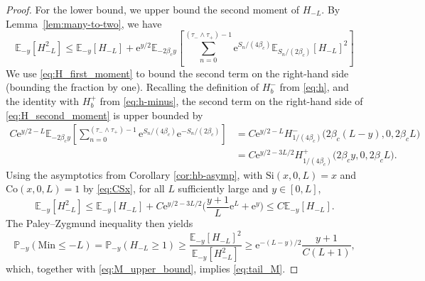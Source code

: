 \documentclass[a4paper, a4wide, 10pt, reqno]{amsart}
\theoremstyle{plain}
\theoremstyle{definition}
\numberwithin{equation}{section}
\newcommand{\E}{\mathbb E}
\newcommand{\Prob}{\mathbb{P}}
\newcommand{\re}{{\mathrm e}}
\newcommand{\Co}{{\mathrm{Co}}}
\newcommand{\Si}{{\mathrm{Si}}}
\begin{document}
\begin{proof}
     For the lower bound, we upper bound the second moment of $H_{-L}$. By Lemma~\ref{lem:many-to-two}, we have
     \begin{equation}
     \label{eq:H_second_moment}
         \E_{-y}[H_{-L}^2] \le \E_{-y}[H_{-L}] + \re^{y/2}\E_{-2\beta_c y}\left[\sum_{n=0}^{(\tau_-\wedge \tau_+)-1} \re^{S_n/(4\beta_c)}\E_{S_n/(2\beta_c)}[H_{-L}]^2\right]
     \end{equation}
     We use \eqref{eq:H_first_moment} to bound the second term on the right-hand side (bounding the fraction  by one). Recalling the definition of $H^-_b$ from \eqref{eq:h}, and the identity with $H^+_b$ from \eqref{eq:h-minus}, the second term on the right-hand side of \eqref{eq:H_second_moment} is upper bounded by
	\begin{align*}
		C \re^{y/2-L}\E_{-2\beta_c y}\left[\sum_{n=0}^{(\tau_-\wedge \tau_+)-1} \re^{S_n/(4\beta_c)}\re^{-S_n/(2\beta_c)}\right] &=C\re^{y/2-L}H^-_{1/(4\beta_c)}\big(2\beta_c (L-y), 0, 2\beta_c L\big)\\&=C\re^{y/2-3L/2}H^+_{1/(4\beta_c)}\big(2\beta_c y, 0, 2\beta_c L\big).
	\end{align*}
    Using the asymptotics from Corollary \ref{cor:hb-asymp}, with $\Si(x, 0, L)=x$ and $\Co(x, 0, L)=1$ by \eqref{eq:CSx},  for all $L$ sufficiently large and $y\in [0, L]$,
    \begin{equation}\label{eq:H_second_moment_final}
    \E_{-y}[H_{-L}^2]\le \E_{-y}[H_{-L}] + C\re^{y/2-3L/2}\Big(\frac{y+1}{L}\re^{L} + \re^{y}\Big) 
    \le C\E_{-y}[H_{-L}].
    \end{equation}
	 The Paley--Zygmund inequality then yields
	\[
	\Prob_{-y}(\mathrm{Min}\le -L) = \Prob_{-y}(H_{-L}\ge 1) \ge \frac{\E_{-y}[H_{-L}]^2}{\E_{-y}[H_{-L}^2]} \ge \re^{-(L-y)/2}\frac{y+1}{C(L+1)},
	\]
	which, together with \eqref{eq:M_upper_bound}, implies \eqref{eq:tail_M}.\smallskip
	

\end{proof}
\end{document}
